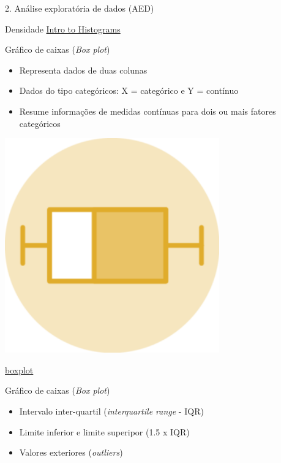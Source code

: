 \documentclass[
  ignorenonframetext,
]{beamer}
\begin{document}
\begin{frame}[fragile]{2. Análise exploratória de dados (AED)}
\begin{block}{Densidade}
\href{https://plotly.com/chart-studio-help/histogram/}{Intro to
Histograms}
\end{block}

\begin{block}{Gráfico de caixas (\emph{Box plot})}
\protect\hypertarget{gruxe1fico-de-caixas-box-plot}{}
\begin{itemize}
\item
  Representa dados de duas colunas
\item
  Dados do tipo categóricos: X = categórico e Y = contínuo
\item
  Resume informações de medidas contínuas para dois ou mais fatores
  categóricos
\end{itemize}

\includegraphics[width=3.64583in,height=3.64583in]{img/plot_boxplot.png}

\href{https://www.data-to-viz.com/caveat/boxplot.html}{boxplot}
\end{block}

\begin{block}{Gráfico de caixas (\emph{Box plot})}
\protect\hypertarget{gruxe1fico-de-caixas-box-plot-1}{}
\begin{itemize}
\item
  Intervalo inter-quartil (\emph{interquartile range} - IQR)
\item
  Limite inferior e limite superipor (1.5 x IQR)
\item
  Valores exteriores (\emph{outliers})
\end{itemize}


\end{block}
\end{frame}
\end{document}
